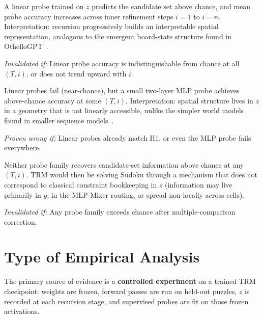 \documentclass{article}
\begin{document}
\begin{description}[leftmargin=2em, style=nextline]
    \item[\textbf{H1 (Progressive linear encoding):}]  A linear probe trained on $z$ predicts the candidate set above chance, and mean probe accuracy increases across inner refinement steps $i=1$ to $i=n$.  Interpretation: recursion progressively builds an interpretable spatial representation, analogous to the emergent board-state structure found in OthelloGPT~\cite{nanda2023linear}.

    \textit{Invalidated if:} Linear probe accuracy is indistinguishable from chance at all $(T,i)$, or does not trend upward with $i$.

    \item[\textbf{H2 (Non-linear encoding):}]  Linear probes fail (near-chance), but a small two-layer MLP probe achieves above-chance accuracy at some $(T,i)$.  Interpretation: spatial structure lives in $z$ in a geometry that is not linearly accessible, unlike the simpler world models found in smaller sequence models~\cite{li2023emergent}.

    \textit{Proven wrong if:} Linear probes already match H1, or even the MLP probe fails everywhere.

    \item[\textbf{H3 (No interpretable candidate encoding):}]  Neither probe family recovers candidate-set information above chance at any $(T,i)$.  TRM would then be solving Sudoku through a mechanism that does not correspond to classical constraint bookkeeping in $z$ (information may live primarily in $y$, in the MLP-Mixer routing, or spread non-locally across cells).

    \textit{Invalidated if:} Any probe family exceeds chance after multiple-comparison correction.
\end{description}


\section{Type of Empirical Analysis}
\label{sec:empirical}

The primary source of evidence is a \textbf{controlled experiment} on a trained TRM checkpoint: weights are frozen, forward passes are run on held-out puzzles, $z$ is recorded at each recursion stage, and supervised probes are fit on those frozen activations.
\end{document}
